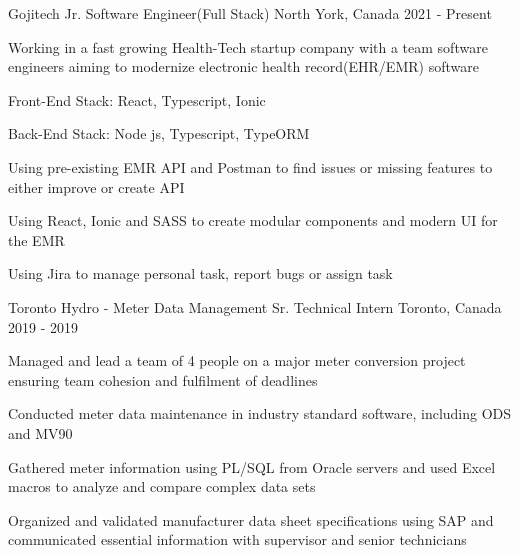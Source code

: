 


\begin{cventries}


\cventry
{Gojitech} %
{Jr. Software Engineer(Full Stack)} %
{North York, Canada} %
{2021 - Present} %
{ %
\begin{cvitems}
\item {Working in a fast growing Health-Tech startup company with a team software engineers aiming to modernize electronic health record(EHR/EMR) software}
\item {Front-End Stack: React, Typescript, Ionic}
\item {Back-End Stack: Node js, Typescript, TypeORM}
\item {Using pre-existing EMR API and Postman to find issues or missing features to either improve or create API}
\item {Using React, Ionic and SASS to create modular components and modern UI for the EMR}
\item {Using Jira to manage personal task, report bugs or assign task  }
\end{cvitems}
}




\cventry
{Toronto Hydro - Meter Data Management} %
{Sr. Technical Intern} %
{Toronto, Canada} %
{2019 - 2019} %
{ %
\begin{cvitems}
\item {Managed and lead a team of 4 people on a major meter conversion project ensuring team cohesion and fulfilment of deadlines}
\item {Conducted meter data maintenance in industry standard software, including ODS and MV90}
\item {Gathered meter information using PL/SQL from Oracle servers and used Excel macros to analyze and compare complex data sets}
\item {Organized and validated manufacturer data sheet specifications using SAP and communicated essential information with supervisor and senior technicians}
\end{cvitems}
}




\end{cventries}
